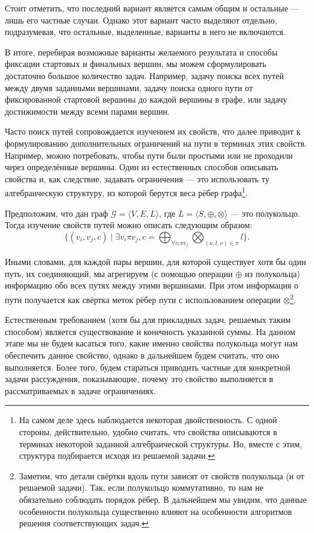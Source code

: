 Стоит отметить, что последний вариант является самым общим и остальные --- лишь его частные случаи. 
Однако этот вариант часто выделяют отдельно, подразумевая, что остальные, выделенные, варианты в него не включаются.

В итоге, перебирая возможные варианты желаемого результата и способы фиксации стартовых и финальных вершин, мы можем сформулировать достаточно большое количество задач. Например, задачу поиска всех путей между двумя заданными вершинами, задачу поиска одного пути от фиксированной стартовой вершины до каждой вершины в графе, или задачу достижимости между всеми парами вершин.

Часто поиск путей сопровождается изучением их свойств, что далее приводит к формулированию дополнительных ограничений на пути в терминах этих свойств. Например, можно потребовать, чтобы пути были простыми или не проходили через определённые вершины. Один из естественных способов описывать свойства и, как следствие, задавать ограничения --- это использовать ту алгебраическую структуру, из которой берутся веса рёбер графа\footnote{На самом деле здесь наблюдается некоторая двойственность. С одной стороны, действительно, удобно считать, что свойства описываются в терминах некоторой заданной алгебраической структуры. Но, вместе с этим, структура подбирается исходя из решаемой задачи.}. 

Предположим, что дан граф $\mathcal{G} = \langle V, E, L\rangle $, где $L = \langle S, \oplus, \otimes \rangle$ --- это полукольцо. Тогда изучение свойств путей можно описать следующим образом: 
\begin{equation} \label{eq:algPathProblem} 
  \{(v_i, v_j, c) \mid \exists v_i \pi v_j, c = \bigoplus_{\forall v_i \pi v_j} \bigotimes_{(u,l,v) \in \pi } l \}.
\end{equation}

Иными словами, для каждой пары вершин, для которой существует хотя бы один путь, их соединяющий, мы агрегируем (с помощью операции $\oplus$ из полукольца) информацию обо всех путях между этими вершинами. При этом информация о пути получается как свёртка меток рёбер пути с использованием операции $\otimes$\footnote{Заметим, что детали свёртки вдоль пути зависят от свойств полукольца (и от решаемой задачи). Так, если полукольцо коммутативно, то нам не обязательно соблюдать порядок рёбер. В дальнейшем мы увидим, что данные особенности полукольца существенно влияют на особенности алгоритмов решения соответствующих задач.}.

Естественным требованием (хотя бы для прикладных задач, решаемых таким способом) является существование и конечность указанной суммы. На данном этапе мы не будем касаться того, какие именно свойства полукольца могут нам обеспечить данное свойство, однако в дальнейшем будем считать, что оно выполняется. Более того, будем стараться приводить частные для конкретной задачи рассуждения, показывающие, почему это свойство выполняется в рассматриваемых в задаче ограничениях.

